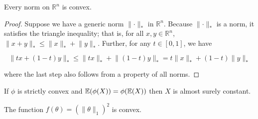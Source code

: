 \begin{proposition}\label{cvx.norm.cvx}Every norm on \(\mathbb{R}^n\) is convex. 

\end{proposition}

\begin{proof}Suppose we have a generic norm \(\lVert \cdot \rVert_*\) in \(\mathbb{R}^n\). Because  \(\lVert \cdot \rVert_*\) is a norm, it satisfies the triangle inequality; that is, for all \(x, y \in \mathbb{R}^n\),\(\lVert x + y \rVert_* \leq \lVert x  \rVert_*  + \lVert  y \rVert_*\). Further, for any \(t \in [0,1]\), we have


\[
\lVert tx + (1-t)y \rVert_* \leq \lVert tx  \rVert_*  + \lVert(1-t)  y \rVert_* =  t\lVert x  \rVert_*  +  (1-t) \lVert y \rVert_*
\]

where the last step also follows from a property of all norms.


\end{proof}

\begin{proposition}If \(\phi\) is strictly convex and \(\mathbb{E}(\phi(X)) = \phi(\mathbb{E}(X))\) then \(X\) is almost surely constant.

\end{proposition}

\begin{proposition} The function \(f(\theta) = ( \lVert \theta \rVert_1)^2\) is convex.

\end{proposition}


